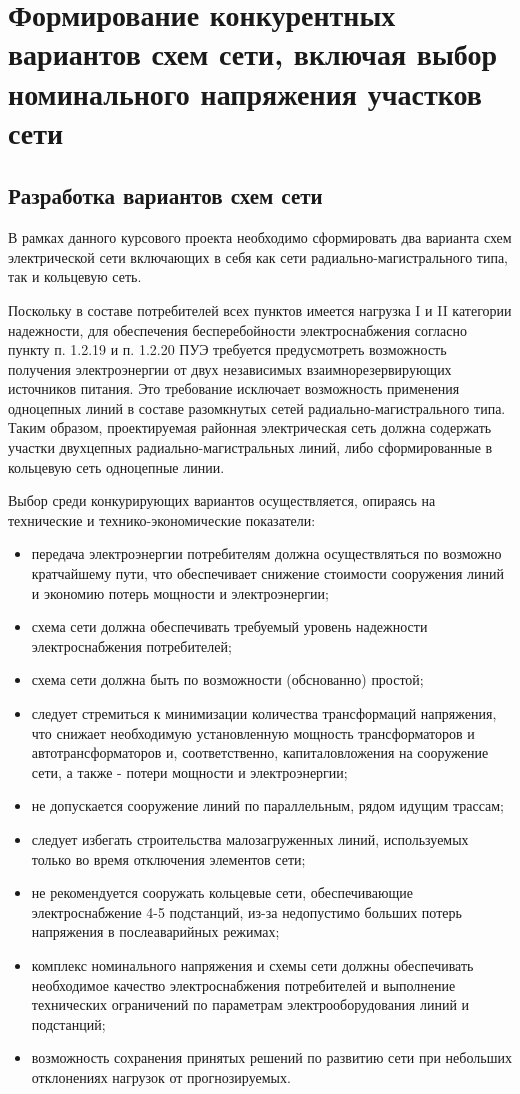\chapter{Формирование конкурентных вариантов схем сети, включая выбор номинального напряжения участков сети}
\label{cha:var_scheme}

\section{Разработка вариантов схем сети}

В рамках данного курсового проекта необходимо сформировать два варианта схем электрической сети включающих в себя как сети радиально-магистрального типа, так и кольцевую сеть.

Поскольку в составе потребителей всех пунктов имеется нагрузка I и II категории надежности, для обеспечения бесперебойности электроснабжения согласно пункту п. 1.2.19 и п. 1.2.20 ПУЭ \cite{пуэ7} требуется предусмотреть возможность получения электроэнергии от двух независимых взаимнорезервирующих источников питания. Это требование исключает возможность применения одноцепных линий в составе разомкнутых сетей радиально-магистрального типа. Таким образом, проектируемая районная электрическая сеть должна содержать участки двухцепных радиально-магистральных линий, либо сформированные в кольцевую сеть одноцепные линии.

Выбор среди конкурирующих вариантов осуществляется, опираясь на технические и технико-экономические показатели:
\begin{itemize}
	\item передача электроэнергии потребителям должна осуществляться по возможно кратчайшему пути, что обеспечивает снижение стоимости сооружения линий и экономию потерь мощности и электроэнергии;
	\item схема сети должна обеспечивать требуемый уровень надежности электроснабжения потребителей;
	\item схема сети должна быть по возможности (обснованно) простой;
	\item следует стремиться к минимизации количества трансформаций напряжения, что снижает необходимую установленную мощность трансформаторов и автотрансформаторов и, соответственно, капиталовложения на сооружение сети, а также - потери мощности и электроэнергии;
	\item не допускается сооружение линий по параллельным, рядом идущим трассам;
	\item следует избегать строительства малозагруженных линий, используемых только во время отключения элементов сети;
	\item не рекомендуется сооружать кольцевые сети, обеспечивающие электроснабжение 4-5 подстанций, из-за недопустимо больших потерь напряжения в послеаварийных режимах;
	\item комплекс номинального напряжения и схемы сети должны обеспечивать необходимое качество электроснабжения потребителей и выполнение технических ограничений по параметрам электрооборудования линий и подстанций;
	\item возможность сохранения принятых решений по развитию сети при небольших отклонениях нагрузок от прогнозируемых.
\end{itemize}

